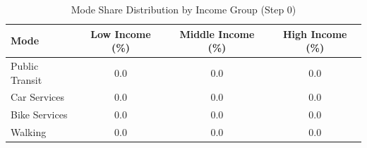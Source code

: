 \begin{table}[!t]
\centering
\caption{Mode Share Distribution by Income Group (Step 0)}
\label{tab:mode_share_step0}
\begin{tabular}{lccc}
\hline
\textbf{Mode} & \textbf{Low Income (\%)} & \textbf{Middle Income (\%)} & \textbf{High Income (\%)} \\
\hline
Public Transit & 0.0 & 0.0 & 0.0 \\
Car Services & 0.0 & 0.0 & 0.0 \\
Bike Services & 0.0 & 0.0 & 0.0 \\
Walking & 0.0 & 0.0 & 0.0 \\
\hline
\end{tabular}
\end{table}